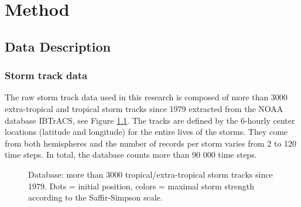 

\chapter{Method}
\section{Data Description}
\subsection{Storm track data}
The raw storm track data used in this research is composed of more than 3000 extra-tropical and tropical storm tracks since 1979 extracted from the NOAA database IBTrACS\cite{knapp2010international}, see Figure \ref{fig:storm_tracks}. The tracks are defined by the 6-hourly center locations (latitude and longitude) for the entire lives of the storms. They come from both hemispheres and the number of records per storm varies from 2 to 120 time steps. In total, the database counts more than 90 000 time steps. 
\begin{figure}
	\begin{center}
		\hsize {}
	\end{center}
	\caption{Database: more than 3000 tropical/extra-tropical storm
		tracks since 1979. Dots = initial position, colors = maximal storm strength according to the Saffir-Simpson scale.}
	\label{fig:storm_tracks}
\end{figure}
